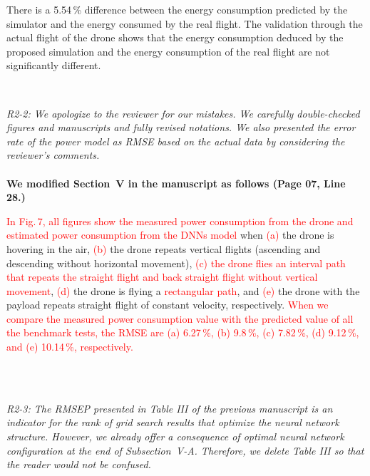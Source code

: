 \documentclass[onecolumn]{IEEEconf}
\begin{document}
\begin{description}
\begin{mdframed}[ linewidth=.75pt, userdefinedwidth=0.9\textwidth]
    There is a 5.54\,\% difference between the energy consumption predicted by the simulator and the energy consumed by the real flight.
    The validation through the actual flight of the drone shows that the energy consumption deduced by the proposed simulation and the energy consumption of the real flight are not significantly different.
        \end{mdframed}
    ~\\	
    \item \textit
    {
    R2-2: We apologize to the reviewer for our mistakes. We carefully double-checked figures and manuscripts and fully revised notations. We also presented the error rate of the power model as RMSE based on the actual data by considering the reviewer’s comments.
    }
    ~\\
    ~\\
    \textbf{We modified Section~V in the manuscript as follows (Page 07, Line 28.)}\\
    \begin{mdframed}[ linewidth=.75pt, userdefinedwidth=0.9\textwidth]
    \textcolor{red}{In Fig.\,7, all figures show the measured power consumption from the drone and estimated power consumption from the DNNs model} when \textcolor{red}{(a)} the drone is hovering in the air, \textcolor{red}{(b)} the drone repeats vertical flights (ascending and descending without horizontal movement), \textcolor{red}{(c) the drone flies an interval path that repeats the straight flight and back straight flight without vertical movement}, \textcolor{red}{(d)} the drone is flying a \textcolor{red}{rectangular path}, and \textcolor{red}{(e)} the drone with the payload repeats straight flight of constant velocity, respectively. 
    \textcolor{red}{When we compare the measured power consumption value with the predicted value of all the benchmark tests, the RMSE are (a) 6.27\,\%, (b) 9.8\,\%, (c) 7.82\,\%, (d) 9.12\,\%, and (e) 10.14\,\%, respectively.}
    \end{mdframed}
    ~\\~\\
	\item \textit
	{
	R2-3: The RMSEP presented in Table III of the previous manuscript is an indicator for the rank of grid search results that optimize the neural network structure. However, we already offer a consequence of optimal neural network configuration at the end of Subsection~V-A. Therefore, we delete Table III so that the reader would not be confused. 
	}
	~\\

\end{description}
\end{document}
